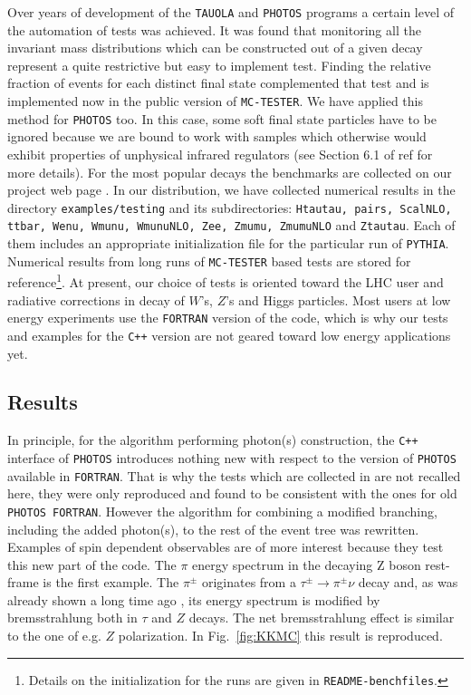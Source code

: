 \documentclass[]{Photos_interface_design}
\begin{document}
Over years of development of the {\tt TAUOLA} and {\tt PHOTOS} programs a certain level 
of the automation of tests was achieved. It was found that monitoring all the invariant mass distributions which can be constructed out of a given decay represent 
a quite restrictive but easy to implement test.
Finding the relative fraction of events for each distinct final state 
 complemented that test and is implemented now in the public version of {\tt MC-TESTER}. 
We have applied this method 
for {\tt PHOTOS} too. In this case, some soft final state particles have to be ignored because we are bound to  work with  samples which otherwise would
exhibit properties of unphysical infrared regulators (see Section 6.1 of 
ref \cite{Davidson:2008ma} for more details). For the most popular 
decays the benchmarks are collected on our project web page \cite{Photos_tests}.
In our distribution, we have collected numerical results in the directory
{\tt examples/testing} and its subdirectories:  
{\tt Htautau, pairs, ScalNLO, ttbar, Wenu, Wmunu, WmunuNLO, Zee, Zmumu, 
ZmumuNLO} and {\tt Ztautau}. Each of them includes
an appropriate initialization file for the particular run of {\tt PYTHIA}. Numerical results from long runs of {\tt MC-TESTER} based tests
are stored for reference\footnote{Details on the initialization for the 
runs are given in 
{\tt README-benchfiles}.}. At present, our choice of tests is oriented toward 
the LHC user and radiative corrections in decay of $W$'s, $Z$'s and Higgs particles.
Most users at low energy experiments use the {\tt FORTRAN} version 
of the code, which is why our tests and examples for the {\tt C++} version are not geared toward 
low energy applications yet.


\subsection{Results}
\label{sec:results}
In principle, for the algorithm performing photon(s) construction, the {\tt C++} interface of
{\tt PHOTOS} introduces nothing new with respect to the 
version of {\tt PHOTOS} available in {\tt FORTRAN}.
That is why the  tests which are collected in \cite{Photos_tests} are not
recalled here, they were only reproduced and found to be consistent with the ones for
old {\tt PHOTOS FORTRAN}.
However the algorithm for combining a modified branching, including the added 
photon(s), to the rest of the event tree was rewritten.
Examples of spin dependent observables are of more interest because they test this new part of the code.
The $\pi$ energy spectrum in the decaying
Z boson rest-frame is the first example. 
The $\pi^\pm$ originates from a $\tau^\pm \to \pi^\pm \nu $ decay and, 
as was already shown a long time ago \cite{Boillot:1988re}, its energy spectrum is modified by bremsstrahlung both in $\tau$ and $Z$ decays. The net
bremsstrahlung  effect is similar to the one of e.g. $Z$ polarization. In Fig.~\ref{fig:KKMC} this result is reproduced.
\end{document}
